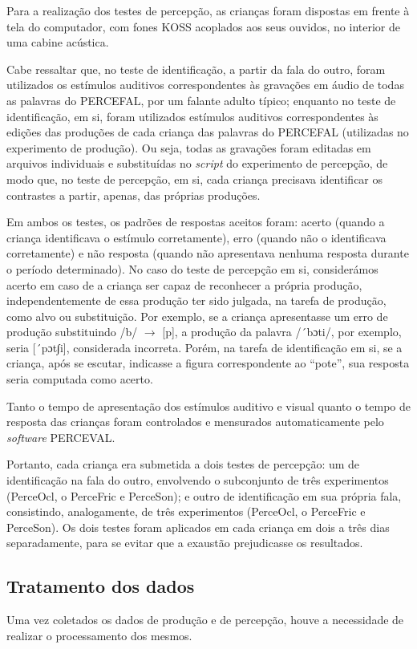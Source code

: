 \documentclass[output=paper,colorlinks,citecolor=brown,booklanguage=portuguese]{langscibook}
\begin{document}
Para a realização dos testes de percepção, as crianças foram dispostas em frente à tela do computador, com fones KOSS acoplados aos seus ouvidos, no interior de uma cabine acústica.

Cabe ressaltar que, no teste de identificação, a partir da fala do outro, foram utilizados os estímulos auditivos correspondentes às gravações em áudio de todas as palavras do PERCEFAL, por um falante adulto típico; enquanto no teste de identificação, em si, foram utilizados estímulos auditivos correspondentes às edições das produções de cada criança das palavras do PERCEFAL (utilizadas no experimento de produção). Ou seja, todas as gravações foram editadas em arquivos individuais e substituídas no \emph{script} do experimento de percepção, de modo que, no teste de percepção, em si, cada criança precisava identificar os contrastes a partir, apenas, das próprias produções.

Em ambos os testes, os padrões de respostas aceitos foram: acerto (quando a criança identificava o estímulo corretamente), erro (quando não o identificava corretamente) e não resposta (quando não apresentava nenhuma resposta durante o período determinado). No caso do teste de percepção em si, considerámos acerto em caso de a criança ser capaz de reconhecer a própria produção, independentemente de essa produção ter sido julgada, na tarefa de produção, como alvo ou substituição. Por exemplo, se a criança apresentasse um erro de produção substituindo /b/ $\to$ [p], a produção da palavra /´bɔti/, por exemplo, seria [´pɔt∫i], considerada incorreta. Porém, na tarefa de identificação em si, se a criança, após se escutar, indicasse a figura correspondente ao “pote”, sua resposta seria computada como acerto.

Tanto o tempo de apresentação dos estímulos auditivo e visual quanto o tempo de resposta das crianças foram controlados e mensurados automaticamente pelo \emph{software} PERCEVAL.

Portanto, cada criança era submetida a dois testes de percepção: um de identificação na fala do outro, envolvendo o subconjunto de três experimentos (PerceOcl, o PerceFric e PerceSon); e outro de identificação em sua própria fala, consistindo, analogamente, de três experimentos (PerceOcl, o PerceFric e PerceSon). Os dois testes foram aplicados em cada criança em dois a três dias separadamente, para se evitar que a exaustão prejudicasse os resultados.

\subsection{Tratamento dos dados}
Uma vez coletados os dados de produção e de percepção, houve  a necessidade de realizar o processamento dos mesmos.
\end{document}
